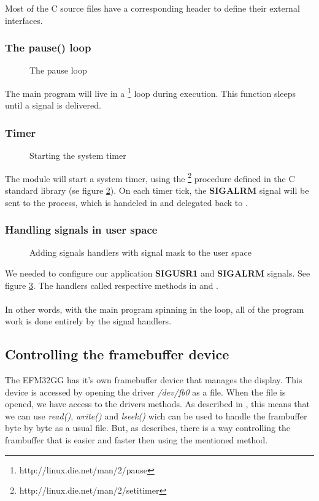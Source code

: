 Most of the C source files have a corresponding header to define their external interfaces.

\subsubsection{The pause() loop}
\begin{figure}[h]
	\centering
	
	\caption{The pause loop}
	\label{fig:pause-loop}
\end{figure}
The main program will live in a \footnote{http://linux.die.net/man/2/pause} loop during execution. This function sleeps until a signal is delivered.

\subsubsection{Timer}
\begin{figure}[h]
	\centering
	
	\caption{Starting the system timer}
	\label{fig:setitimer}
\end{figure}
The  module will start a system timer, using the \footnote{http://linux.die.net/man/2/setitimer} procedure defined in the C standard library (se figure \ref{fig:setitimer}). On each timer tick, the \textbf{SIGALRM} signal will be sent to the process, which is handeled in  and delegated back to .

\subsubsection{Handling signals in user space}
\begin{figure}[h]
	\centering
	
	\caption{Adding signals handlers with signal mask to the user space}
	\label{fig:sighandler}
\end{figure}
We needed to configure our application \textbf{SIGUSR1} and \textbf{SIGALRM} signals. See figure \ref{fig:sighandler}. The handlers called respective methods in  and .\\
\\
In other words, with the main program spinning in the  loop, all of the program work is done entirely by the signal handlers.


\subsection{Controlling the framebuffer device}
The EFM32GG has it's own framebuffer device that manages the display. This device is accessed by opening the driver \emph{/dev/fb0} as a file. When the file is opened, we have access to the drivers methods. As described in \cite[section 5.4.2]{compendium}, this means that we can use \emph{read()}, \emph{write()} and \emph{lseek()} wich can be used to handle the frambuffer byte by byte as a usual file. But, as \cite[section 5.4.2]{compendium} describes, there is a way controlling the frambuffer that is easier and faster then using the mentioned method. \\

